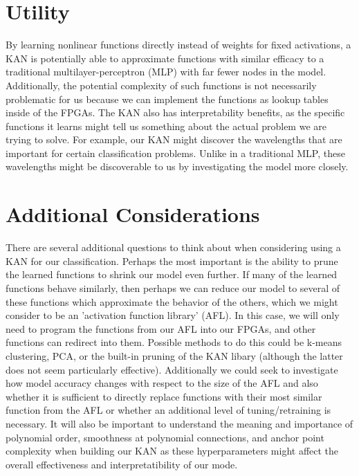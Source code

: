 \documentclass{article}
\begin{document}
\section{Utility}
By learning nonlinear functions directly instead of weights for fixed activations, a KAN is potentially able to approximate functions with similar efficacy to a traditional multilayer-perceptron (MLP) with far fewer nodes in the model. Additionally, the potential complexity of such functions is not necessarily problematic for us because we can implement the functions as lookup tables inside of the FPGAs. The KAN also has interpretability benefits, as the specific functions it learns might tell us something about the actual problem we are trying to solve. For example, our KAN might discover the wavelengths that are important for certain classification problems. Unlike in a traditional MLP, these wavelengths might be discoverable to us by investigating the model more closely.

\section{Additional Considerations}
There are several additional questions to think about when considering using a KAN for our classification. Perhaps the most important is the ability to prune the learned functions to shrink our model even further. If many of the learned functions behave similarly, then perhaps we can reduce our model to several of these functions which approximate the behavior of the others, which we might consider to be an 'activation function library' (AFL). In this case, we will only need to program the functions from our AFL into our FPGAs, and other functions can redirect into them. Possible methods to do this could be k-means clustering, PCA, or the built-in pruning of the KAN libary (although the latter does not seem particularly effective). Additionally we could seek to investigate how model accuracy changes with respect to the size of the AFL and also whether it is sufficient to directly replace functions with their most similar function from the AFL or whether an additional level of tuning/retraining is necessary. It will also be important to understand the meaning and importance of polynomial order, smoothness at polynomial connections, and anchor point complexity when building our KAN as these hyperparameters might affect the overall effectiveness and interpretatibility of our mode.
\end{document}
